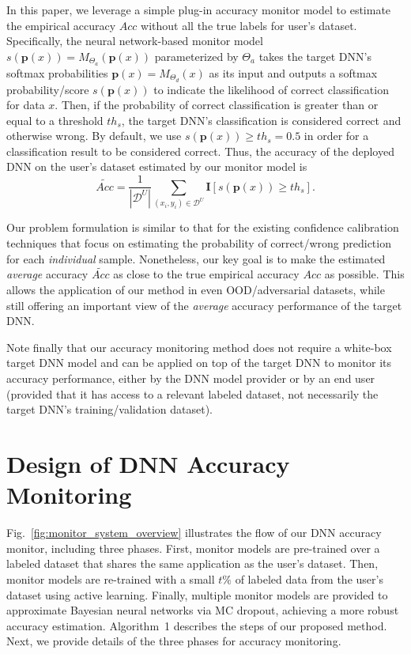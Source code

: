 \documentclass{article}
\begin{document}
In this paper,
we leverage a simple plug-in accuracy monitor model to estimate the  empirical accuracy $Acc$ without all
the true labels for user's dataset. Specifically,
the neural network-based monitor model  $s(\mathbf{p}(x))=M_{\Theta_a}(\mathbf{p}(x))$ parameterized by $\Theta_a$ takes the target
DNN's softmax probabilities $\mathbf{p}(x)=M_{\Theta_d}(x)$
 as its input and outputs
a softmax probability/score $s(\mathbf{p}(x))$ to indicate the likelihood of correct classification for data $x$.
Then, if the probability of correct classification
is greater than or equal to a threshold $th_s$,
the target DNN's classification is considered correct and otherwise wrong.
By default,
we use $s(\mathbf{p}(x))\geq th_s=0.5$ in order
for a classification result to be considered correct.
Thus, the accuracy of the deployed DNN on the user's dataset estimated by our monitor model
is
\begin{equation}\label{eqn:estimate_accuracy}
\widetilde{Acc} = \frac{1}{|\mathcal{D}^U|}\sum_{(x_i,y_i)\in\mathcal{D}^U}
\mathbf{I}\left[s(\mathbf{p}(x))\geq th_s\right].
\end{equation}


Our problem formulation is similar
to that for the existing
confidence calibration techniques \cite{DNN_Uncertainty_PostHoc_Dirichlet_NIPS_2019_kull2019beyond,DNN_Calibration_TemperatureScaling_ICML_2017_calibration_guo_2017}
that focus on estimating the probability
of correct/wrong prediction for each \emph{individual}
sample.
Nonetheless, our key goal is to make the estimated \emph{average} accuracy
$\widetilde{Acc}$ as close to the true  empirical accuracy $Acc$ as possible.
This allows the application
of our method in even OOD/adversarial datasets, while still offering
an important view of the \emph{average} accuracy performance of
the target DNN.

Note finally that  our accuracy monitoring method does not require
a white-box target DNN model and
can be  applied on top of the target DNN
to monitor its accuracy performance,
either by the DNN model provider
or by an end user (provided that it has access
to a relevant labeled dataset, not necessarily the target DNN's
training/validation dataset). 

\section{Design of DNN Accuracy Monitoring}\label{sec:methodology}

Fig.~\ref{fig:monitor_system_overview} illustrates the flow of
our DNN accuracy monitor, including three phases. First, monitor models
are pre-trained over a labeled dataset that shares the
same application as the user's dataset.
Then, monitor models are re-trained with a small $t\%$ of labeled data from the user's dataset using active learning. Finally,
multiple monitor models are provided to approximate Bayesian neural networks via MC dropout, achieving a more robust accuracy estimation. Algorithm~1 describes the steps of our proposed method. Next, we provide details of the three phases for accuracy monitoring.
\end{document}
